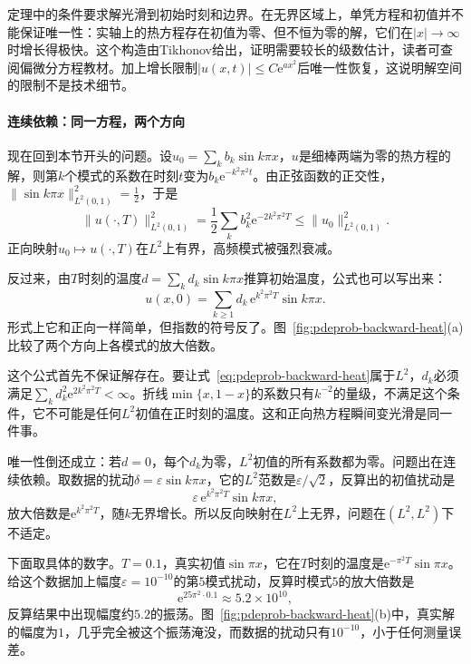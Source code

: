 定理中的条件要求解光滑到初始时刻和边界。在无界区域上，单凭方程和初值并不能保证唯一性：实轴上的热方程存在初值为零、但不恒为零的解，它们在$\lvert x\rvert\to\infty$时增长得极快。这个构造由Tikhonov给出，证明需要较长的级数估计，读者可查阅偏微分方程教材。加上增长限制$\lvert u(x,t)\rvert\leq C\mathrm{e}^{ax^{2}}$后唯一性恢复，这说明解空间的限制不是技术细节。

\paragraph{连续依赖：同一方程，两个方向}
现在回到本节开头的问题。设$u_0=\sum_kb_k\sin k\pi x$，$u$是细棒两端为零的热方程的解，则第$k$个模式的系数在时刻$t$变为$b_k\mathrm{e}^{-k^{2}\pi^{2}t}$。由正弦函数的正交性，$\lVert\sin k\pi x\rVert_{L^{2}(0,1)}^{2}=\frac12$，于是
\[
  \lVert u(\cdot,T)\rVert_{L^{2}(0,1)}^{2}
  =\frac12\sum_kb_k^{2}\mathrm{e}^{-2k^{2}\pi^{2}T}
  \leq\lVert u_0\rVert_{L^{2}(0,1)}^{2}.
\]
正向映射$u_0\mapsto u(\cdot,T)$在$L^{2}$上有界，高频模式被强烈衰减。

反过来，由$T$时刻的温度$d=\sum_kd_k\sin k\pi x$推算初始温度，公式也可以写出来：
\begin{equation}
  u(x,0)=\sum_{k\geq1}d_k\,\mathrm{e}^{k^{2}\pi^{2}T}\sin k\pi x.
  \label{eq:pdeprob-backward-heat}
\end{equation}
形式上它和正向一样简单，但指数的符号反了。图~\ref{fig:pdeprob-backward-heat}(a)比较了两个方向上各模式的放大倍数。

这个公式首先不保证解存在。要让式~\eqref{eq:pdeprob-backward-heat}属于$L^{2}$，$d_k$必须满足$\sum_kd_k^{2}\mathrm{e}^{2k^{2}\pi^{2}T}<\infty$。折线$\min\{x,1-x\}$的系数只有$k^{-2}$的量级，不满足这个条件，它不可能是任何$L^{2}$初值在正时刻的温度。这和正向热方程瞬间变光滑是同一件事。

唯一性倒还成立：若$d=0$，每个$d_k$为零，$L^{2}$初值的所有系数都为零。问题出在连续依赖。取数据的扰动$\delta=\varepsilon\sin k\pi x$，它的$L^{2}$范数是$\varepsilon/\sqrt{2}$，反算出的初值扰动是
\[
  \varepsilon\,\mathrm{e}^{k^{2}\pi^{2}T}\sin k\pi x,
\]
放大倍数是$\mathrm{e}^{k^{2}\pi^{2}T}$，随$k$无界增长。所以反向映射在$L^{2}$上无界，问题在$(L^{2},L^{2})$下不适定。

下面取具体的数字。$T=0.1$，真实初值$\sin\pi x$，它在$T$时刻的温度是$\mathrm{e}^{-\pi^{2}T}\sin\pi x$。给这个数据加上幅度$\varepsilon=10^{-10}$的第$5$模式扰动，反算时模式$5$的放大倍数是
\[
  \mathrm{e}^{25\pi^{2}\cdot0.1}\approx5.2\times10^{10},
\]
反算结果中出现幅度约$5.2$的振荡。图~\ref{fig:pdeprob-backward-heat}(b)中，真实解的幅度为$1$，几乎完全被这个振荡淹没，而数据的扰动只有$10^{-10}$，小于任何测量误差。

